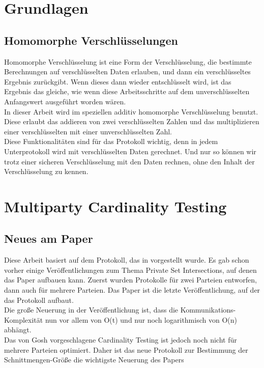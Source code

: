 \documentclass[a4paper,10pt]{scrartcl}
\begin{document}
\section{Grundlagen}

\subsection{Homomorphe Verschlüsselungen}
Homomorphe Verschlüsselung ist eine Form der Verschlüsselung, die bestimmte Berechnungen auf verschlüsselten Daten erlauben, und dann ein verschlüsseltes Ergebnis zurückgibt. Wenn dieses dann wieder entschlüsselt wird, ist das Ergebnis das gleiche, wie wenn diese Arbeitsschritte auf dem unverschlüsselten Anfangswert ausgeführt worden wären. \cite{Yi2014} \\
In dieser Arbeit wird im speziellen additiv homomorphe Verschlüsselung benutzt. Diese  erlaubt das addieren von zwei verschlüsselten Zahlen und das multiplizieren einer verschlüsselten mit einer unverschlüsselten Zahl.\\
Diese Funktionalitäten sind für das Protokoll wichtig, denn in jedem Unterprotokoll wird mit verschlüsselten Daten gerechnet. Und nur so können wir trotz einer sicheren Verschlüsselung mit den Daten rechnen, ohne den Inhalt der Verschlüsselung zu kennen.


\section{Multiparty Cardinality Testing}

\subsection{Neues am Paper}
Diese Arbeit basiert auf dem Protokoll, das in \cite{Doettling2021} vorgestellt wurde. Es gab schon vorher einige Veröffentlichungen zum Thema Private Set Intersections, auf denen das Paper aufbauen kann. Zuerst wurden Protokolle für zwei Parteien entworfen, dann auch für mehrere Parteien. Das Paper
\cite{Ghosh2019} ist die letzte Veröffentlichung, auf der das Protokoll aufbaut.\\
Die große Neuerung in der Veröffentlichung \cite{Ghosh2019} ist, dass die Kommunikations-Komplexität nun vor allem von O(t) und nur noch logarithmisch von O(n) abhängt. \cite{Ghosh2019}\\
Das von Gosh vorgeschlagene Cardinality Testing ist jedoch noch nicht  für mehrere Parteien optimiert. Daher ist das neue Protokoll zur Bestimmung der Schnittmengen-Größe die wichtigste Neuerung des Papers \cite{Doettling2021}
\end{document}
